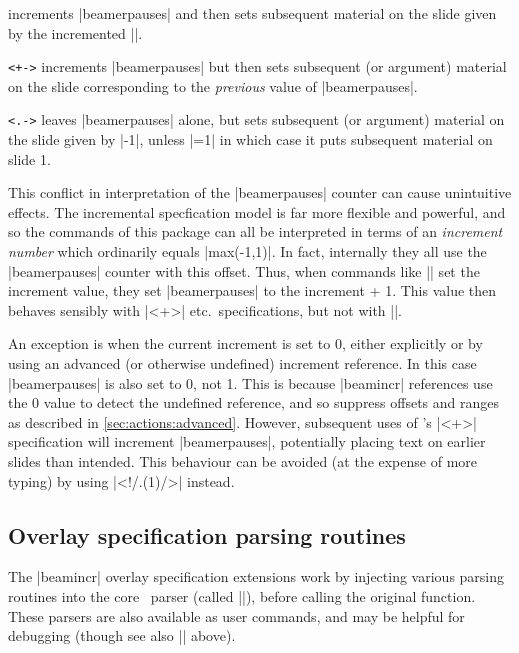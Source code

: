 \documentclass[a4paper]{ltxdoc}
\begin{document}
\begin{command}{\pause}
  increments |beamerpauses| and then sets subsequent material on the slide
  given by the incremented |\value{beamerpauses}|. 
\end{command}

\begin{command}{\onslide\texttt{<+->}}
  increments |beamerpauses| but then sets subsequent (or argument) material on
  the slide corresponding to the \emph{previous} value of |beamerpauses|.
\end{command}

\begin{command}{\onslide\texttt{<.->}}
  leaves |beamerpauses| alone, but sets subsequent (or argument) material on the
  slide given by |\value{beamerpauses}-1|, unless |\value{beamerpauses}=1| in
  which case it puts subsequent material on slide 1.
\end{command}
%
This conflict in interpretation of the |beamerpauses| counter can cause
unintuitive effects.  The incremental specfication model is far more flexible
and powerful, and so the commands of this package can all be interpreted in
terms of an \emph{increment number} which ordinarily equals
|max(\value{beamerpauses}-1,1)|.  In fact, internally they all use the
|beamerpauses| counter with this offset.  Thus, when commands like |\resetincr|
set the increment value, they set |beamerpauses| to the increment + 1.  This
value then behaves sensibly with |<+>| etc.\ specifications, but not with
|\pause|.

An exception is when the current increment is set to 0, either explicitly or by
using an advanced (or otherwise undefined) increment reference.  In this case
|beamerpauses| is also set to 0, not 1.  This is because |beamincr| references
use the 0 value to detect the undefined reference, and so suppress offsets and
ranges as described in \cref{sec:actions:advanced}.  However, subsequent uses of
\beamer's |<+>| specification will increment |beamerpauses|, potentially placing
text on earlier slides than intended.  This behaviour can be avoided (at the
expense of more typing) by using |<!/.(1)/>| instead.


\subsection{Overlay specification parsing routines}

The |beamincr| overlay specification extensions work by injecting various
parsing routines into the core \beamer\ parser (called |\beamer@masterdecode|),
before calling the original function.  These parsers are also available as user
commands, and may be helpful for debugging (though see also |\beamincrdebug|
above).  
\end{document}
